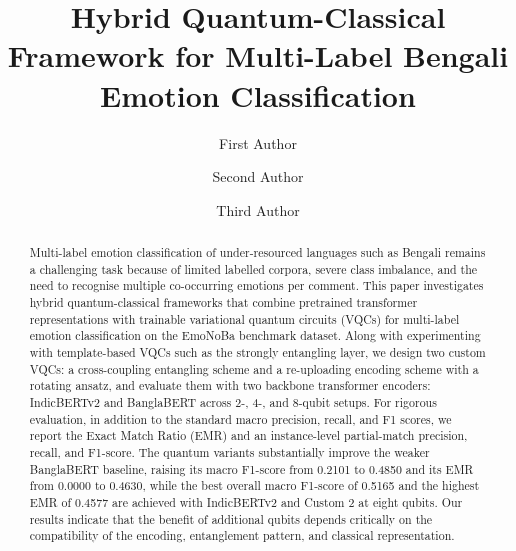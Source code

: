 \documentclass[runningheads]{llncs}
\begin{document}
%
\title{Hybrid Quantum-Classical Framework for Multi-Label Bengali Emotion Classification}
%
%
\author{First Author \and
Second Author \and
Third Author}
%
%
%
\maketitle              %
%
\begin{abstract}
Multi-label emotion classification of under-resourced languages such as Bengali remains a challenging task because of limited labelled corpora, severe class imbalance, and the need to recognise multiple co-occurring emotions per comment. This paper investigates hybrid quantum-classical frameworks that combine pretrained transformer representations with trainable variational quantum circuits (VQCs) for multi-label emotion classification on the EmoNoBa benchmark dataset. Along with experimenting with template-based VQCs such as the strongly entangling layer, we design two custom VQCs: a cross-coupling entangling scheme and a re-uploading encoding scheme with a rotating ansatz, and evaluate them with two backbone transformer encoders: IndicBERTv2 and BanglaBERT across 2-, 4-, and 8-qubit setups. For rigorous evaluation, in addition to the standard macro precision, recall, and F1 scores, we report the Exact Match Ratio (EMR) and an instance-level partial-match precision, recall, and F1-score. The quantum variants substantially improve the weaker BanglaBERT baseline, raising its macro F1-score from 0.2101 to 0.4850 and its EMR from 0.0000 to 0.4630, while the best overall macro F1-score of 0.5165 and the highest EMR of 0.4577 are achieved with IndicBERTv2 and Custom 2 at eight qubits. Our results indicate that the benefit of additional qubits depends critically on the compatibility of the encoding, entanglement pattern, and classical representation.

\end{abstract}
%
%
%
\end{document}
